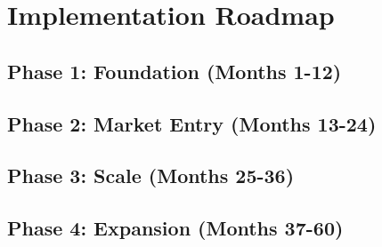 \section{Implementation Roadmap}\label{sec:implementation}


\subsection{Phase 1: Foundation (Months 1-12)}

\subsection{Phase 2: Market Entry (Months 13-24)}

\subsection{Phase 3: Scale (Months 25-36)}

\subsection{Phase 4: Expansion (Months 37-60)}

